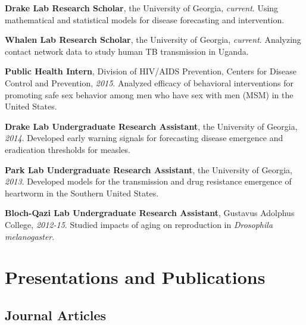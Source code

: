 \documentclass[letterpaper]{article}
\renewenvironment{itemize}{
  \begin{list}{}{
    \setlength{\leftmargin}{1.5em}
  }
}{
  \end{list}
}
\begin{document}
\begin{itemize}
\item \textbf{Drake Lab Research Scholar}, the University of Georgia, \textit{current}. Using mathematical and statistical models for disease forecasting and intervention. 
\item \textbf{Whalen Lab Research Scholar}, the University of Georgia, \textit{current}. Analyzing contact network data to study human TB transmission in Uganda. 
\item \textbf{Public Health Intern}, Division of HIV/AIDS Prevention, Centers for Disease Control and Prevention, \textit{2015}. Analyzed efficacy of behavioral interventions for promoting safe sex behavior among men who have sex with men (MSM) in the United States.
\item \textbf{Drake Lab Undergraduate Research Assistant}, the University of Georgia, \textit{2014}. Developed early warning signals for forecasting disease emergence and eradication thresholds  for measles.
\item \textbf{Park Lab Undergraduate Research Assistant}, the University of Georgia, \textit{2013}. Developed models for the transmission and drug resistance emergence of heartworm in the Southern United States. 
\item \textbf{Bloch-Qazi Lab Undergraduate Research Assistant}, Gustavus Adolphus College, \textit{2012-15}. Studied impacts of aging on reproduction in \textit{Drosophila melanogaster}. 

\end{itemize}

\section*{Presentations and Publications}

\subsection*{Journal Articles}
\end{document}
